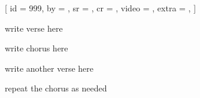 [
    id    = {999},
    by    = {},
    sr    = {},
    cr    = {},
    video = {},
    extra = {},
]

\beginverse
write verse here
\endverse

\beginchorus
write chorus here
\endchorus

\beginverse
write another verse here
\endverse

\beginchorus
repeat the chorus as needed
\endchorus

\endsong

